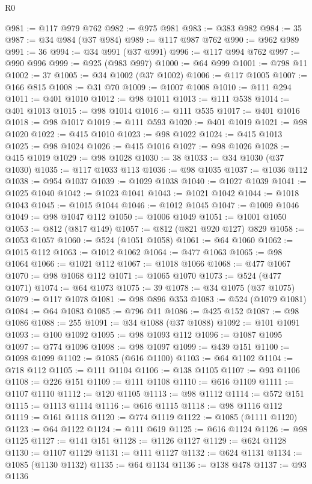 \begin{lexlean}{R0}
\begin{coremodule}
@981 := @117 @979 @762
@982 := @975 @981
@983 := @383 @982
@984 := 35
@987 := @34 @984 (@37 @984)
@989 := @117 @987 @762
@990 := @962 @989
@991 := 36
@994 := @34 @991 (@37 @991)
@996 := @117 @994 @762
@997 := @990 @996
@999 := @925 (@983 @997)
@1000 := @64 @999
@1001 := @798 @11
@1002 := 37
@1005 := @34 @1002 (@37 @1002)
@1006 := @117 @1005
@1007 := @166 @815
@1008 := @31 @70
@1009 := @1007 @1008
@1010 := @111 @294
@1011 := @401 @1010
@1012 := @98 @1011
@1013 := @111 @538
@1014 := @401 @1013
@1015 := @98 @1014
@1016 := @111 @535
@1017 := @401 @1016
@1018 := @98 @1017
@1019 := @111 @593
@1020 := @401 @1019
@1021 := @98 @1020
@1022 := @415 @1010
@1023 := @98 @1022
@1024 := @415 @1013
@1025 := @98 @1024
@1026 := @415 @1016
@1027 := @98 @1026
@1028 := @415 @1019
@1029 := @98 @1028
@1030 := 38
@1033 := @34 @1030 (@37 @1030)
@1035 := @117 @1033 @113
@1036 := @98 @1035
@1037 := @1036 @112
@1038 := @954 @1037
@1039 := @1029 @1038
@1040 := @1027 @1039
@1041 := @1025 @1040
@1042 := @1023 @1041
@1043 := @1021 @1042
@1044 := @1018 @1043
@1045 := @1015 @1044
@1046 := @1012 @1045
@1047 := @1009 @1046
@1049 := @98 @1047 @112
@1050 := @1006 @1049
@1051 := @1001 @1050
@1053 := @812 (@817 @149)
@1057 := @812 (@821 @920 @127) @829
@1058 := @1053 @1057
@1060 := @524 (@1051 @1058)
@1061 := @64 @1060
@1062 := @1015 @112
@1063 := @1012 @1062
@1064 := @477 @1063
@1065 := @98 @1064
@1066 := @1021 @112
@1067 := @1018 @1066
@1068 := @477 @1067
@1070 := @98 @1068 @112
@1071 := @1065 @1070
@1073 := @524 (@477 @1071)
@1074 := @64 @1073
@1075 := 39
@1078 := @34 @1075 (@37 @1075)
@1079 := @117 @1078
@1081 := @98 @896 @353
@1083 := @524 (@1079 @1081)
@1084 := @64 @1083
@1085 := @796 @11
@1086 := @425 @152
@1087 := @98 @1086
@1088 := 255
@1091 := @34 @1088 (@37 @1088)
@1092 := @101 @1091
@1093 := @100 @1092
@1095 := @98 @1093 @112
@1096 := @1087 @1095
@1097 := @774 @1096
@1098 := @98 @1097
@1099 := @439 @151
@1100 := @1098 @1099
@1102 := @1085 (@616 @1100)
@1103 := @64 @1102
@1104 := @718 @112
@1105 := @111 @1104
@1106 := @138 @1105
@1107 := @93 @1106
@1108 := @226 @151
@1109 := @111 @1108
@1110 := @616 @1109
@1111 := @1107 @1110
@1112 := @120 @1105
@1113 := @98 @1112
@1114 := @572 @151
@1115 := @1113 @1114
@1116 := @616 @1115
@1118 := @98 @1116 @112
@1119 := @161 @1118
@1120 := @774 @1119
@1122 := @1085 (@1111 @1120)
@1123 := @64 @1122
@1124 := @111 @619
@1125 := @616 @1124
@1126 := @98 @1125
@1127 := @141 @151
@1128 := @1126 @1127
@1129 := @624 @1128
@1130 := @1107 @1129
@1131 := @111 @1127
@1132 := @624 @1131
@1134 := @1085 (@1130 @1132)
@1135 := @64 @1134
@1136 := @138 @478
@1137 := @93 @1136

\end{coremodule}
\end{lexlean}

